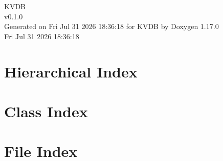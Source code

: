 \documentclass[twoside]{book}
\newcommand{\+}{\discretionary{\mbox{\scriptsize$\hookleftarrow$}}{}{}}
\newcommand{\clearemptydoublepage}{%
    \newpage{\pagestyle{empty}\cleardoublepage}%
  }
\begin{document}
  \raggedbottom
    \hypersetup{pageanchor=false,
                bookmarksnumbered=true,
                pdfencoding=unicode
               }
  \begin{titlepage}
  \vspace*{7cm}
  \begin{center}%
  {\Large KVDB}\\
  [1ex]\large v0.\+1.\+0 \\
  \vspace*{1cm}
  {\large Generated on Fri Jul 31 2026 18:\+36:\+18 for KVDB by Doxygen 1.17.0}\\
    \vspace*{0.5cm}
    {\small Fri Jul 31 2026 18:36:18}
  \end{center}
  \end{titlepage}
  \clearemptydoublepage
  \tableofcontents
  \clearemptydoublepage
  \hypersetup{pageanchor=true}

\chapter{Hierarchical Index}

\chapter{Class Index}

\chapter{File Index}

\end{document}
